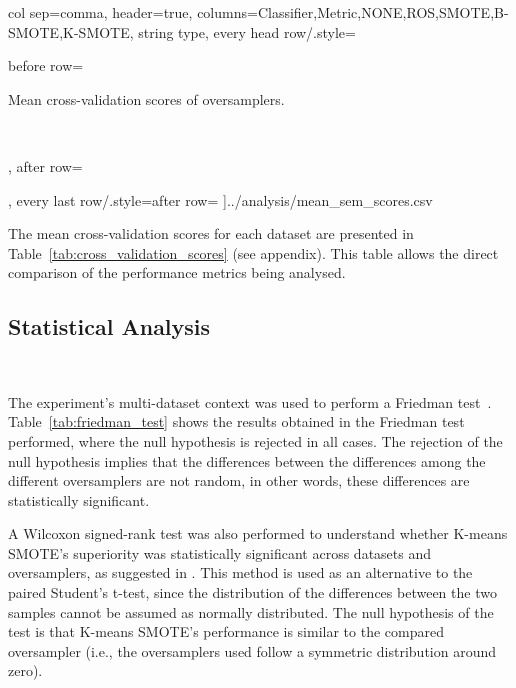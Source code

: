 \documentclass[information,article,submit,moreauthors,pdftex]{Definitions/mdpi}
\begin{document}
	col sep=comma,
	header=true,
	columns={Classifier,Metric,NONE,ROS,SMOTE,B-SMOTE,K-SMOTE}, 
    string type,
    every head row/.style={before row={
    \caption{
		Mean cross-validation scores of oversamplers.
    }\label{tab:mean_sem_scores}\\
    \toprule}, after row=\midrule\endhead},
	every last row/.style={after row=\bottomrule}
]{../analysis/mean_sem_scores.csv}
\begin{paracol}{2}
\linenumbers
\switchcolumn

The mean cross-validation scores for each dataset are presented in
Table~\ref{tab:cross_validation_scores} (see appendix). This table allows the direct
comparison of the performance metrics being analysed.

\subsection{Statistical Analysis}~\label{sec:statistical_analysis}

The experiment's multi-dataset context was used to perform a Friedman
test~\citep{friedman1937use}. Table~\ref{tab:friedman_test} shows the results
obtained in the Friedman test performed, where the null hypothesis is rejected
in all cases. The rejection of the null hypothesis implies that the
differences between the differences among the different oversamplers are not
random, in other words, these differences are statistically significant.

\end{paracol}
\begin{table}[H]
    \caption{
        Results for Friedman test. Statistical significance is tested at a
        level of $\alpha = 0.05$. The null hypothesis is that there is no
        difference in the classification outcome across oversamplers.
    \vspace{-.6cm}}\label{tab:friedman_test}
\end{table}
\begin{paracol}{2}
\linenumbers
\switchcolumn

A Wilcoxon signed-rank test \citep{wilcoxon1992} was also performed to
understand whether K-means SMOTE's superiority was statistically significant
across datasets and oversamplers, as suggested in \citep{demvsar2006}. This
method is used as an alternative to the paired Student's t-test, since the
distribution of the differences between the two samples cannot be assumed as
normally distributed. The null hypothesis of the test is that K-means SMOTE's
performance is similar to the compared oversampler (i.e., the oversamplers
used follow a symmetric distribution around zero).

\pagebreak
\end{paracol}
\end{document}
